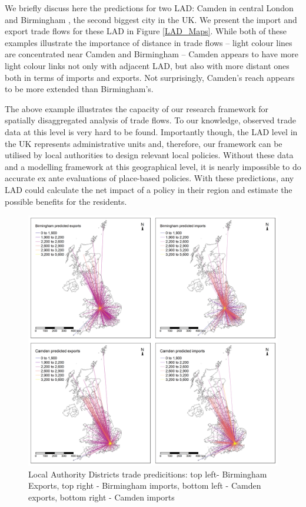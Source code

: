 \documentclass[]{interact}
\theoremstyle{plain}%
\theoremstyle{definition}
\theoremstyle{remark}
\begin{document}
We briefly discuss here the predictions for two LAD: Camden in central
London and Birmingham , the second biggest city in the UK. We present
the import and export trade flows for these LAD in Figure
\ref{LAD_Maps}. While both of these examples illustrate the importance
of distance in trade flows -- light colour lines are concentrated near
Camden and Birmingham -- Camden appears to have more light colour links
not only with adjacent LAD, but also with more distant ones both in
terms of imports and exports. Not surprisingly, Camden's reach appears
to be more extended than Birmingham's.

The above example illustrates the capacity of our research framework for
spatially disaggregated analysis of trade flows. To our knowledge,
observed trade data at this level is very hard to be found. Importantly
though, the LAD level in the UK represents administrative units and,
therefore, our framework can be utilised by local authorities to design
relevant local policies. Without these data and a modelling framework at
this geographical level, it is nearly impossible to do accurate ex ante
evaluations of place-based policies. With these predictions, any LAD
could calculate the net impact of a policy in their region and estimate
the possible benefits for the residents.

\begin{figure}[p]
\includegraphics[width=1\linewidth]{figures/Predictions} \caption{\label{LAD_Maps}Local Authority Districts trade predicitions: top left- Birmingham Exports, top right - Birmingham imports, bottom left - Camden exports, bottom right - Camden imports}\label{fig:unnamed-chunk-14}
\end{figure}
\end{document}
